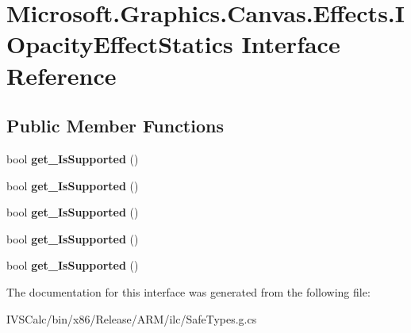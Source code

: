 \hypertarget{interface_microsoft_1_1_graphics_1_1_canvas_1_1_effects_1_1_i_opacity_effect_statics}{}\section{Microsoft.\+Graphics.\+Canvas.\+Effects.\+I\+Opacity\+Effect\+Statics Interface Reference}
\label{interface_microsoft_1_1_graphics_1_1_canvas_1_1_effects_1_1_i_opacity_effect_statics}
\subsection*{Public Member Functions}
\begin{DoxyCompactItemize}
\item 
\mbox{\label{interface_microsoft_1_1_graphics_1_1_canvas_1_1_effects_1_1_i_opacity_effect_statics_afc9718b0174f6f3e49ba99db9b960aa0}} 
bool {\bfseries get\+\_\+\+Is\+Supported} ()
\item 
\mbox{\label{interface_microsoft_1_1_graphics_1_1_canvas_1_1_effects_1_1_i_opacity_effect_statics_afc9718b0174f6f3e49ba99db9b960aa0}} 
bool {\bfseries get\+\_\+\+Is\+Supported} ()
\item 
\mbox{\label{interface_microsoft_1_1_graphics_1_1_canvas_1_1_effects_1_1_i_opacity_effect_statics_afc9718b0174f6f3e49ba99db9b960aa0}} 
bool {\bfseries get\+\_\+\+Is\+Supported} ()
\item 
\mbox{\label{interface_microsoft_1_1_graphics_1_1_canvas_1_1_effects_1_1_i_opacity_effect_statics_afc9718b0174f6f3e49ba99db9b960aa0}} 
bool {\bfseries get\+\_\+\+Is\+Supported} ()
\item 
\mbox{\label{interface_microsoft_1_1_graphics_1_1_canvas_1_1_effects_1_1_i_opacity_effect_statics_afc9718b0174f6f3e49ba99db9b960aa0}} 
bool {\bfseries get\+\_\+\+Is\+Supported} ()
\end{DoxyCompactItemize}


The documentation for this interface was generated from the following file\+:\begin{DoxyCompactItemize}
\item 
I\+V\+S\+Calc/bin/x86/\+Release/\+A\+R\+M/ilc/Safe\+Types.\+g.\+cs\end{DoxyCompactItemize}
